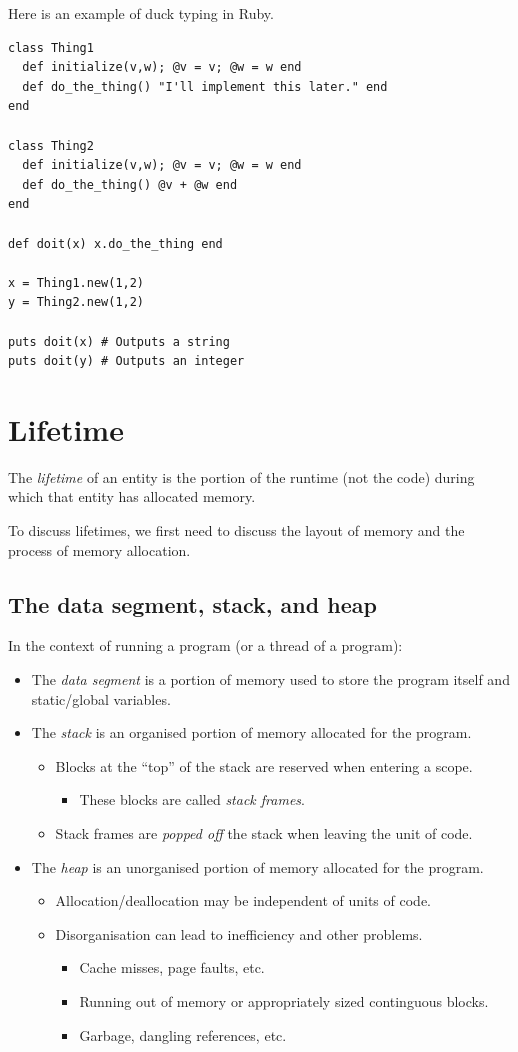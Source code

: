 \documentclass[11pt]{article}
\theoremstyle{definition}
\begin{document}
Here is an example of duck typing in Ruby.
\begin{verbatim}
class Thing1
  def initialize(v,w); @v = v; @w = w end
  def do_the_thing() "I'll implement this later." end
end

class Thing2
  def initialize(v,w); @v = v; @w = w end
  def do_the_thing() @v + @w end
end
  
def doit(x) x.do_the_thing end

x = Thing1.new(1,2)
y = Thing2.new(1,2)

puts doit(x) # Outputs a string
puts doit(y) # Outputs an integer
\end{verbatim}

\section{Lifetime}
\label{sec:org0c9fc0b}
The \emph{lifetime} of an entity is the portion of the runtime
(not the code) during which that entity has allocated memory.

To discuss lifetimes, we first need to discuss
the layout of memory and the process of memory allocation.

\subsection{The data segment, stack, and heap}
\label{sec:orgcd5d82c}
In the context of running a program (or a thread of a program):
\begin{itemize}
\item The \emph{data segment} is a portion of memory used to store the
program itself and static/global variables.
\item The \emph{stack} is an organised portion of memory allocated for the program.
\begin{itemize}
\item Blocks at the “top” of the stack are reserved when entering
a scope.
\begin{itemize}
\item These blocks are called \emph{stack frames}.
\end{itemize}
\item Stack frames are \emph{popped off} the stack when leaving the unit of code.
\end{itemize}
\item The \emph{heap} is an unorganised portion of memory allocated for the program.
\begin{itemize}
\item Allocation/deallocation may be independent of units of code.
\item Disorganisation can lead to inefficiency and other problems.
\begin{itemize}
\item Cache misses, page faults, etc.
\item Running out of memory or appropriately sized continguous blocks.
\item Garbage, dangling references, etc.
\end{itemize}
\end{itemize}
\end{itemize}
\end{document}
